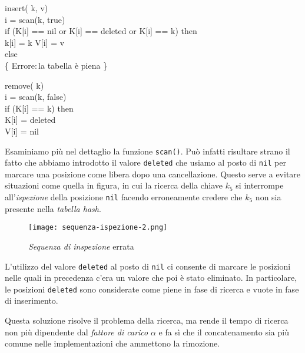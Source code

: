 \newpage
\begin{codecont}
\rmbreak\ind insert( k,  v)\\
     i = scan(k, true)\\
    if (K[i] == nil or K[i] == deleted or K[i] == k) then\\
        \indf k[i] = k\hfill{}
        \indf V[i] = v\\
    \ind else\\
        \indf \{ Errore:\,la tabella è piena \}

\nl{}
\rmbreak\ind remove( k)\\
    \ind {} i = scan(k, false)\\
    \ind if (K[i] == k) then\\
        \indf K[i] = deleted\\
        \indf V[i] = nil\\
\end{codecont}

\bigskip\noindent
Esaminiamo più nel dettaglio la funzione \texttt{scan()}. Può infatti risultare
strano il fatto che abbiamo introdotto il valore \texttt{deleted} che usiamo al
posto di \texttt{nil} per marcare una posizione come libera dopo una cancellazione.
Questo serve a evitare situazioni come quella in figura, in cui la ricerca della
chiave $k_5$ si interrompe all'\emph{ispezione} della posizione \texttt{nil}
facendo erroneamente credere che $k_5$ non sia presente nella \emph{tabella hash}.

\begin{figure}[h!]
    \centering
    \texttt{[image: sequenza-ispezione-2.png]}
    \caption{\emph{Sequenza di inspezione} errata}
\end{figure}\noindent
L'utilizzo del valore \texttt{deleted} al posto di \texttt{nil} ci consente di
marcare le posizioni nelle quali in precedenza c'era un valore che poi è stato
eliminato. In particolare, le posizioni \texttt{deleted} sono considerate come
piene in fase di ricerca e vuote in fase di inserimento.

Questa soluzione risolve il problema della ricerca, ma rende il tempo di ricerca
non più dipendente dal \emph{fattore di carico} $\alpha$ e fa sì che il
concatenamento sia più comune nelle implementazioni che ammettono la rimozione.

\newpage
